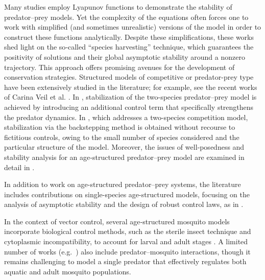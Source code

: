 \documentclass[10pt, a4paper]{amsart}
\theoremstyle{plain}
\theoremstyle{definition}
\theoremstyle{remark}
\numberwithin{equation}{section}
\begin{document}
Many studies employ Lyapunov functions to demonstrate the stability of predator–prey models. Yet the complexity of the equations often forces one to work with simplified (and sometimes unrealistic) versions of the model in order to construct these functions analytically. Despite these simplifications, these works shed light on the so‑called “species harvesting” technique, which guarantees the positivity of solutions and their global asymptotic stability around a nonzero trajectory. This approach offers promising avenues for the development of conservation strategies. Structured models of competitive or predator-prey type have been extensively studied in the literature; for example, see the recent works of Carina Veil et al. \cite{ref45,ref77}. In \cite{ref45}, stabilization of the two-species predator--prey model is achieved by introducing an additional control term that specifically strengthens the predator dynamics. In \cite{ref77}, which addresses a two-species competition model, stabilization via the backstepping method is obtained without recourse to fictitious controls, owing to the small number of species considered and the particular structure of the model. Moreover, the issues of well‑posedness and stability analysis for an age‑structured predator–prey model are examined in detail in \cite{ref51, ref50}.%

In addition to work on age-structured predator–prey systems, the literature includes contributions on single-species age-structured models, focusing on the analysis of asymptotic stability and the design of robust control laws, as in \cite{ref70,ref69,ref78}.

In the context of vector control, several age‐structured mosquito models incorporate biological control methods, such as the sterile insect technique and cytoplasmic incompatibility, to account for larval and adult stages \cite{ref38, ref42, ref44, ref43, ref41}.  A limited number of works (e.g.\ \cite{ref52}) also include predator–mosquito interactions, though it remains challenging to model a single predator that effectively regulates both aquatic and adult mosquito populations.
\end{document}
